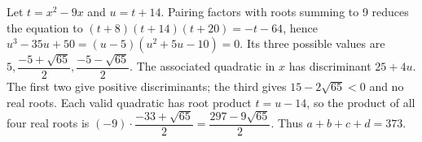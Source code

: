 Let $t=x^2-9x$ and $u=t+14$. Pairing factors with roots summing to 9 reduces the equation to $(t+8)(t+14)(t+20)=-t-64$, hence $u^3-35u+50=(u-5)(u^2+5u-10)=0$. Its three possible values are $5,\dfrac{-5+\sqrt{65}}{2},\dfrac{-5-\sqrt{65}}{2}$. The associated quadratic in $x$ has discriminant $25+4u$. The first two give positive discriminants; the third gives $15-2\sqrt{65}<0$ and no real roots. Each valid quadratic has root product $t=u-14$, so the product of all four real roots is $(-9)\cdot\dfrac{-33+\sqrt{65}}{2}=\dfrac{297-9\sqrt{65}}{2}$. Thus $\boxed{a+b+c+d=373}$.
